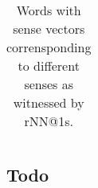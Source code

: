 \documentclass[11pt]{article}
\begin{document}
\begin{table}
{\begin{tabular}{llll}
    \bottomrule
  \end{tabular} 
  }
  \caption{Words with sense vectors corrensponding to different senses as
  witnessed by rNN@1s.
  }
  \label{tab:alkoto}
\end{table}

\subsection{Todo}
\end{document}
